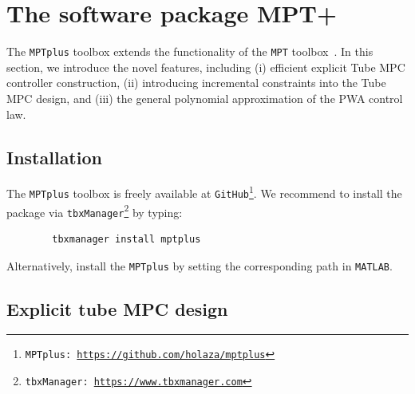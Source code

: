 \documentclass[letterpaper, 10 pt, conference]{ieeeconf}
\begin{document}
	
	\section{The software package MPT+}
	\label{sec:code}
	
	
	
	The \texttt{MPTplus} toolbox extends the functionality of the \texttt{MPT} toolbox~\cite{MPT3}. In this section, we introduce the novel features, including (i) efficient explicit Tube MPC controller construction, (ii) introducing incremental constraints into the Tube MPC design, and (iii) the general polynomial approximation of the PWA control law. 
	
	\subsection{Installation}
	\label{sec:installation}
	
	The \texttt{MPTplus} toolbox is freely available at \texttt{GitHub}\footnote{\texttt{MPTplus: \url{https://github.com/holaza/mptplus}}}. We recommend to install the package via \texttt{tbxManager}\footnote{\texttt{tbxManager: \url{https://www.tbxmanager.com}}} by typing:
	\begin{verbatim}
		tbxmanager install mptplus
	\end{verbatim} 
	Alternatively, install the \texttt{MPTplus} by setting the corresponding path in \texttt{MATLAB}. 
	
	
	\subsection{Explicit tube MPC design}
	\label{sec:mptplus_tube_mpc}
	
\end{document}
